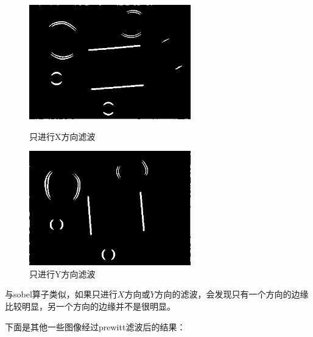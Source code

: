 \documentclass[11pt, a4paper, UTF8]{ctexart}
\begin{document}
\begin{figure}[H]
  \centering
  \begin{minipage}[t]{0.48\textwidth}
  \centering
  \includegraphics[width=7cm]{prewitt_X_rubberband_cap.png}
  \caption{只进行X方向滤波}
  \end{minipage}
  \begin{minipage}[t]{0.48\textwidth}
  \centering
  \includegraphics[width=7cm]{prewitt_Y_rubberband_cap.png}
  \caption{只进行Y方向滤波}
  \end{minipage}
\end{figure}

与sobel算子类似，如果只进行$X$方向或$Y$方向的滤波，会发现只有一个方向的边缘比较明显，另一个方向的边缘并不是很明显。



下面是其他一些图像经过prewitt滤波后的结果：
\end{document}
